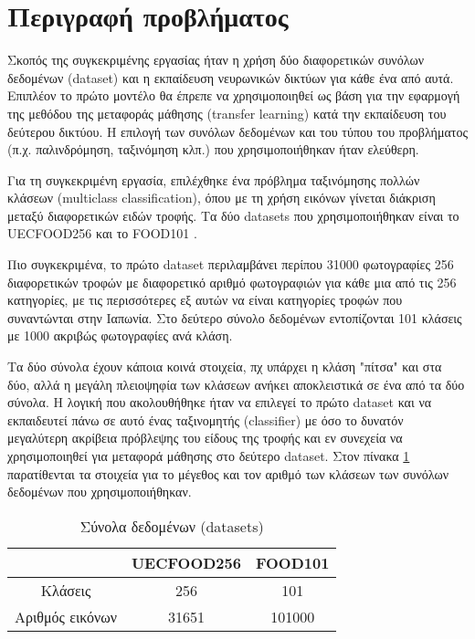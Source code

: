 \vspace{-2em}
\section{Περιγραφή προβλήματος}
\label{Problem Description}
Σκοπός της συγκεκριμένης εργασίας ήταν η χρήση δύο διαφορετικών συνόλων δεδομένων (dataset) και η εκπαίδευση νευρωνικών δικτύων για κάθε ένα από αυτά. Επιπλέον το πρώτο μοντέλο θα έπρεπε να χρησιμοποιηθεί ως βάση για την εφαρμογή της μεθόδου της μεταφοράς μάθησης (transfer learning) κατά την εκπαίδευση του δεύτερου δικτύου. Η επιλογή των συνόλων δεδομένων και του τύπου του προβλήματος (π.χ. παλινδρόμηση, ταξινόμηση κλπ.) που χρησιμοποιήθηκαν ήταν ελεύθερη. 

Για τη συγκεκριμένη εργασία, επιλέχθηκε ένα πρόβλημα ταξινόμησης πολλών κλάσεων (multiclass classification), όπου με τη χρήση εικόνων γίνεται διάκριση μεταξύ διαφορετικών ειδών τροφής. Τα δύο datasets που χρησιμοποιήθηκαν είναι το UECFOOD256 \cite{kaggle_dataset_UECFOOD256} και το FOOD101 \cite{kaggle_dataset_FOOD101}.

Πιο συγκεκριμένα, το πρώτο dataset περιλαμβάνει περίπου 31000 φωτογραφίες 256 διαφορετικών τροφών με διαφορετικό αριθμό φωτογραφιών για κάθε μια από τις 256 κατηγορίες, με τις περισσότερες εξ αυτών να είναι κατηγορίες τροφών που συναντώνται στην Ιαπωνία. Στο δεύτερο σύνολο δεδομένων εντοπίζονται 101 κλάσεις με 1000 ακριβώς φωτογραφίες ανά κλάση. 

Τα δύο σύνολα έχουν κάποια κοινά στοιχεία, πχ υπάρχει η κλάση "πίτσα" και στα δύο, αλλά η μεγάλη πλειοψηφία των κλάσεων ανήκει αποκλειστικά σε ένα από τα δύο σύνολα. Η λογική που ακολουθήθηκε ήταν να επιλεγεί το πρώτο dataset και να εκπαιδευτεί πάνω σε αυτό ένας ταξινομητής (classifier) με όσο το δυνατόν μεγαλύτερη ακρίβεια πρόβλεψης του είδους της τροφής και εν συνεχεία να χρησιμοποιηθεί για μεταφορά μάθησης στο δεύτερο dataset. Στον πίνακα \ref{Food_datasets_table} παρατίθενται τα στοιχεία για το μέγεθος και τον αριθμό των κλάσεων των συνόλων δεδομένων που χρησιμοποιήθηκαν.

\begin{table}[H]
\centering
\begin{tabular}{|c|c|c|}
\hline
                & UECFOOD256 & FOOD101 \\ \hline
Κλάσεις         & 256        & 101     \\ \hline
Αριθμός εικόνων & 31651      & 101000  \\ \hline
\end{tabular}
\caption{Σύνολα δεδομένων (datasets)}
\label{Food_datasets_table}
\end{table}


